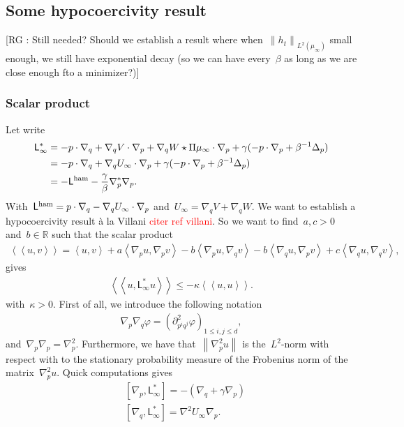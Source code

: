 \documentclass[onefignum,onetabnum]{siamart251216} %
\newcommand{\norm}[1]{\left\lVert#1\right\rVert}
\newcommand{\real}{\mathbb R}
\newcommand{\tcr}[1]{\textcolor{red}{#1}}
\renewcommand{\leq}{\leqslant}
\newcommand{\mescin}{\mu}
\newcommand{\projp}{\Pi}
\newcommand{\adj}{\mathsf{L}_\infty^*}
\newcommand{\Lham}{\mathsf{L}^{\rm{ham}}}
\newcommand{\slangle}[1]{\left\langle #1 \right\rangle}
\newcommand{\dblangle}[1]{\left\langle\!\left\langle #1 \right\rangle\!\right\rangle}
\newcommand{\norml}[1]{\norm{#1}_{L^2(\mescin_\infty)}}
\newcommand{\vq}[1]{q^{#1}}
\newcommand{\vp}[1]{p^{#1}}
\newcommand{\rg}[1]{\textcolor{rose}{\rm{[RG : #1]}}}
\theoremstyle{plain}
\numberwithin{equation}{section}
\numberwithin{theorem}{section}
\begin{document}
\subsection{Some hypocoercivity result}
\rg{Still needed? Should we establish a result where when~$\norml{h_t}$ small enough, we still have exponential decay (so we can have every~$\beta$ as long as we are close enough fto a minimizer?)}
\subsubsection*{Scalar product}
Let write
\begin{align*}
    \adj &= -p\cdot \nabla_q + \nabla_q V \cdot \nabla_p + \nabla_q W \star \projp\mescin_\infty \cdot \nabla_p + \gamma(-p \cdot \nabla_p + \beta^{-1}\Delta_p) \\
    & = -p\cdot \nabla_q + \nabla_q U_\infty \cdot \nabla_p  + \gamma(-p \cdot \nabla_p + \beta^{-1}\Delta_p) \\
    & = -\Lham -\frac{\gamma}{\beta}\nabla_p^* \nabla_p.
\end{align*}
With~$\Lham = p\cdot \nabla_q - \nabla_q U_\infty \cdot \nabla_p$ and~$U_\infty = \nabla_q V + \nabla_q W$.
We want to establish a hypocoercivity result à la Villani \tcr{citer ref villani}.
So we want to find~$a,c>0$ and~$b \in \real$ such that the scalar product
\begin{align}
    \label{eq:neB_sp}
    \dblangle{u,v} = \slangle{u,v} + a\slangle{\nabla_p u,\nabla_p v} -b\slangle{\nabla_p u,\nabla_q v} -b\slangle{\nabla_q u,\nabla_p v} + c\slangle{\nabla_q u,\nabla_q v},
\end{align}
gives
\begin{align*}
    \dblangle{u,\adj u}\leq -\kappa \dblangle{u, u}.
\end{align*}
with~$\kappa > 0$.
First of all,
we introduce the following notation
\begin{align*}
    \nabla_p\nabla_q \varphi = (\partial^2_{\vp{i} \vq{j}}\varphi)_{1\leq i,j \leq d},
\end{align*}
and~$\nabla_p \nabla_p = \nabla_p^2$.
Furthermore,
we have that~$\norm{\nabla_p^2 u}$ is the~$L^2$-norm with respect with to the stationary probability measure of the Frobenius norm of the matrix~$\nabla_p^2 u$.
Quick computations gives
\begin{align}
    \label{eq:commup}
    &[\nabla_p,\adj] = -(\nabla_q + \gamma \nabla_p) \\
    \label{eq:commuq}
    &[\nabla_q,\adj] = \nabla^2 U_\infty \nabla_p.
\end{align}
\end{document}
